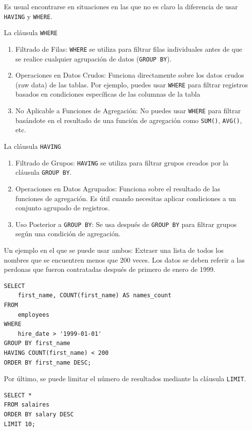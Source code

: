 Es usual encontrarse en situaciones en las que no es claro la diferencia de usar \texttt{HAVING} y \texttt{WHERE}.

La cláusula \texttt{WHERE}
\begin{enumerate}
    \item Filtrado de Filas: \verb|WHERE| se utiliza para filtrar filas individuales antes de que se realice cualquier agrupación de datos (\verb|GROUP BY|).
    \item Operaciones en Datos Crudos: Funciona directamente sobre los datos crudos (raw data) de las tablas. Por ejemplo, puedes usar \verb|WHERE| para filtrar registros basados en condiciones específicas de las columnas de la tabla
    \item No Aplicable a Funciones de Agregación: No puedes usar \verb|WHERE| para filtrar basándote en el resultado de una función de agregación como \verb|SUM()|, \verb|AVG()|, etc.
\end{enumerate}

La cláusula \texttt{HAVING}
\begin{enumerate}
    \item Filtrado de Grupos: \verb|HAVING| se utiliza para filtrar grupos creados por la cláusula \verb|GROUP BY|.
    \item Operaciones en Datos Agrupados: Funciona sobre el resultado de las funciones de agregación. Es útil cuando necesitas aplicar condiciones a un conjunto agrupado de registros.
    \item Uso Posterior a \verb|GROUP BY|: Se usa después de \verb|GROUP BY| para filtrar grupos según una condición de agregación.
\end{enumerate}

Un ejemplo en el que se puede usar ambos: Extraer una lista de todos los nombres que se encuentren menos que 200 veces. Los datos se deben referir a las perdonas que fueron contratadas después de primero de enero de 1999.

\begin{verbatim}
SELECT 
    first_name, COUNT(first_name) AS names_count
FROM
    employees
WHERE
    hire_date > '1999-01-01'
GROUP BY first_name
HAVING COUNT(first_name) < 200
ORDER BY first_name DESC;
\end{verbatim}
Por último, se puede limitar el número de resultados mediante la cláusula \texttt{LIMIT}.

\begin{verbatim}
SELECT *
FROM salaires
ORDER BY salary DESC
LIMIT 10;
\end{verbatim}

